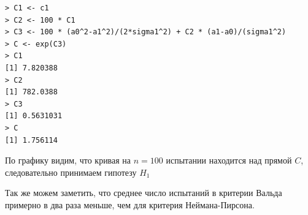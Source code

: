 \documentclass[14pt,a4paper]{scrartcl}
\begin{document}
\begin{lstlisting}
> C1 <- c1
> C2 <- 100 * C1
> C3 <- 100 * (a0^2-a1^2)/(2*sigma1^2) + C2 * (a1-a0)/(sigma1^2)
> C <- exp(C3)
> C1
[1] 7.820388
> C2
[1] 782.0388
> C3
[1] 0.5631031
> C
[1] 1.756114
\end{lstlisting}

\newpage 
\begin{figure}[h]
	\label{ris:neyman-pearson}
\end{figure}

По графику видим, что кривая на $n=100$ испытании находится над прямой $C$, следовательно принимаем гипотезу $H_1$

Так же можем заметить, что среднее число испытаний в критерии Вальда примерно в два раза меньше, чем для критерия Неймана-Пирсона.
\end{document}
